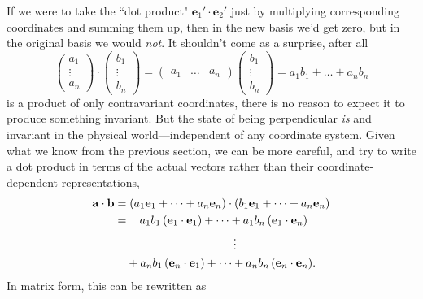 \documentclass[../master.tex]{subfiles}
\begin{document}
	
	
	
	If we were to take the ``dot product" $\mathbf e_1' \cdot \mathbf e_2'$ just by multiplying corresponding coordinates and summing them up, then in the new basis we'd get zero, but in the original basis we would \emph{not}. It shouldn't come as a surprise, after all
	\begin{equation*}
		\begin{pmatrix}
			a_1\\
			\vdots\\
			a_n
		\end{pmatrix}
		\cdot
		\begin{pmatrix}
			b_1\\
			\vdots\\
			b_n
		\end{pmatrix} =
		\begin{pmatrix}
			a_1 &
			\dots &
			a_n
		\end{pmatrix}
		\begin{pmatrix}
			b_1\\
			\vdots\\
			b_n
		\end{pmatrix}
		=
		a_1 b_1 + \dots + a_n b_n
	\end{equation*}
	is a product of only contravariant coordinates, there is no reason to expect it to produce something invariant. But the state of being perpendicular \emph{is} and invariant in the physical world---independent of any coordinate system. Given what we know from the previous section, we can be more careful, and try to write a dot product in terms of the actual vectors rather than their coordinate-dependent representations,
	\begin{equation*}
		\begin{aligned}
			\mathbf a \cdot \mathbf b
			=& \; (a_1 \mathbf e_1 + \dots + a_n \mathbf e_n) \cdot (b_1 \mathbf e_1 + \dots + a_n \mathbf e_n)\\
			=& \, \quad a_1 b_1 \, (\mathbf e_1 \cdot \mathbf e_1) + \dots + a_1 b_n \, (\mathbf e_1 \cdot \mathbf e_n)\\
			&  \hspace{1.3in} \vdots \\
			& + a_n b_1 \, (\mathbf e_n \cdot \mathbf e_1) + \dots + a_n b_n \, (\mathbf e_n \cdot \mathbf e_n).
		\end{aligned}
	\end{equation*}
	In matrix form, this can be rewritten as
\end{document}
